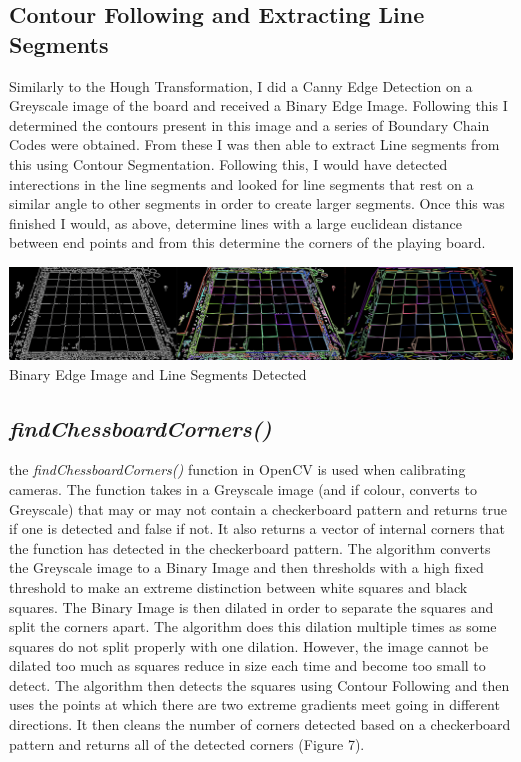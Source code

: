 \documentclass[12pt]{article}
\begin{document}
    \newpage
    \subsection{Contour Following and Extracting Line Segments}
    \par
    Similarly to the Hough Transformation, I did a Canny Edge Detection on a Greyscale image of the board and received a Binary Edge Image. Following this I determined the contours present in this image and a series of Boundary Chain Codes were obtained. From these I was then able to 
    extract Line segments from this using Contour Segmentation. Following this, I would have detected interections in the line segments and looked for line segments that rest on a similar angle to other segments in order to create larger segments. Once this was finished I would, as above,
    determine lines with a large euclidean distance between end points and from this determine the corners of the playing board.
    \begin{center}
        \includegraphics[scale=0.3]{LineSegments.png}
        Binary Edge Image and Line Segments Detected
    \end{center}

    \subsection{\emph{findChessboardCorners()}}
    \par
    the \emph{findChessboardCorners()} function in OpenCV is used when calibrating cameras. The function takes in a Greyscale image (and if colour, converts to Greyscale) that may or may not contain a checkerboard pattern and returns true if one is detected and false if not. It also returns a vector of internal corners that the 
    function has detected in the checkerboard pattern. The algorithm converts the Greyscale image to a Binary Image and then thresholds with a high fixed threshold to make an extreme distinction between white squares and black squares. The Binary Image is then dilated in order to separate the squares and split the corners apart.
    The algorithm does this dilation multiple times as some squares do not split properly with one dilation. However, the image cannot be dilated too much as squares reduce in size each time and become too small to detect. The algorithm then detects the squares using Contour Following and then uses the points at which there are 
    two extreme gradients meet going in different directions. It then cleans the number of corners detected based on a checkerboard pattern and returns all of the detected corners (Figure 7).
    
\end{document}
